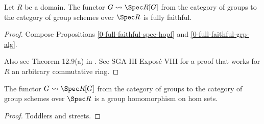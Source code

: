 \begin{theorem}
  \label{0-full-faithful-spec-grp-alg}
  \leanok

  Let $R$ be a domain.
  The functor $G \rightsquigarrow \Spec R[G]$ from the category of groups to the category of group schemes over $\Spec R$ is fully faithful.
\end{theorem}
\begin{proof}
  \leanok

  Compose Propositions \ref{0-full-faithful-spec-hopf} and \ref{0-full-faithful-grp-alg}.

  Also see Theorem 12.9(a) in \cite{Milne_2017}. See SGA III Exposé VIII for a proof that works for $R$ an arbitrary commutative ring.
\end{proof}

\begin{lemma}
  \label{0-spec-grp-alg-hom}

  The functor $G \rightsquigarrow \Spec R[G]$ from the category of groups to the category of group schemes over $\Spec R$ is a group homomorphism on hom sets.
\end{lemma}
\begin{proof}
  \uses{}

  Toddlers and streets.
\end{proof}
